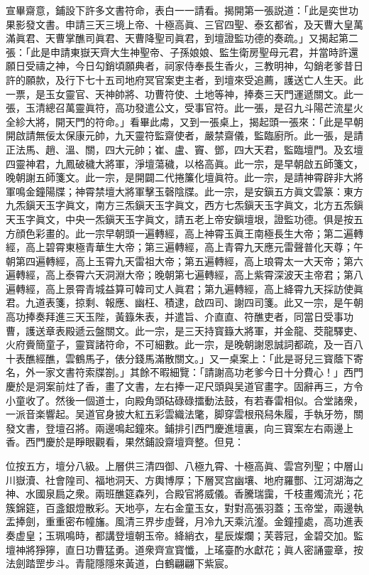 宣畢齋意，鋪設下許多文書符命，表白一一請看。揭開第一張説道：「此是奕世功果影發文書。申請三天三境上帝、十極高眞、三官四聖、泰玄都省，及天曹大皇萬滿眞君、天曹掌醮司眞君、天曹降聖司眞君，到壇證監功德的奏疏。」又揭起第二張：「此是申請東嶽天齊大生神聖帝、子孫娘娘、監生衛房聖母元君，并當時許還願日受禱之神，今日勾銷頃願典者，祠家侍奉長生香火，三教明神，勾銷老爹昔日許的願款，及行下七十五司地府冥官案吏主者，到壇來受追薦，護送亡人生天。此一票，是玉女靈官、天神帥將、功曹符使、土地等神，捧奏三天門運遞關文。此一張，玉清總召萬靈眞符，高功發遣公文，受事官符。此一張，是召九斗陽芒流星火全紾大將，開天門的符命。」看畢此䖏，又到一張桌上，揭起頭一張來：「此是早朝開啟請無佞太保康元帥，九天靈符監齋使者，嚴禁齋儀，監臨廚所。此一張，是請正法馬、趙、溫、關，四大元帥；崔、盧、竇、鄧，四大天君，監臨壇門。及玄壇四靈神君，九鳳破穢大將軍，淨壇蕩穢，以格高眞。此一宗，是早朝啟五師箋文，晚朝謝五師箋文。此一宗，是開闢二代捲簾化壇眞符。此一宗，是請神霄辟非大將軍鳴金鐘陽牒；神霄禁壇大將軍擊玉磬陰牒。此一宗，是安鎭五方眞文雲篆：東方九炁鎭天玉字眞文，南方三炁鎭天玉字眞文，西方七炁鎭天玉字眞文，北方五炁鎭天玉字眞文，中央一炁鎭天玉字眞文，請五老上帝安鎭壇垠，證監功德。俱是按五方顔色彩畫的。此一宗早朝頭一遍轉經，高上神霄玉眞王南極長生大帝；第二遍轉經，高上碧霄東極青華生大帝；第三遍轉經，高上青霄九天應元雷聲普化天尊；午朝第四遍轉經，高上玉霄九天雷祖大帝；第五遍轉經，高上琅霄太一大天帝；第六遍轉經，高上泰霄六天洞淵大帝；晚朝第七遍轉經，高上紫霄深波天主帝君；第八遍轉經，高上景霄青城益算可韓司丈人眞君；第九遍轉經，高上絳霄九天採訪使眞君。九道表箋，掠剩、報應、幽枉、積逮，啟四司、謝四司箋。此又一宗，是午朝高功捧奏拜進三天玉陛，黃籙朱表，并遣旨、介直直、符醮吏者，同當日受事功曹，護送章表殿遞云盤關文。此一宗，是三天持寳籙大將軍，并金龍、茭龍驛吏、火府賫簡童子，靈寳諸符命，不可細數。此一宗，是晚朝謝恩誠詞都疏，及一百八十表醮經醮，雲鶴馬子，俵分錢馬滿散關文。」又一桌案上：「此是哥兒三寳蔭下寄名，外一家文書符索牒劄。」其餘不暇細覽：「請謝高功老爹今日十分費心！」西門慶於是洞案前炷了香，畫了文書，左右捧一疋尺頭與吴道官畫字。固辭再三，方令小童收了。然後一個道士，向殿角頭𥑮碌碌擂動法鼓，有若春雷相似。合堂諸衆，一派音楽響起。吴道官身披大紅五彩雲織法氅，脚穿雲根飛舄朱履，手執牙笏，關發文書，登壇召將。兩邊鳴起鐘來。鋪排引西門慶進壇裏，向三寳案左右兩邊上香。西門慶於是睜眼觀看，果然鋪設齋壇齊整。但見：

\begin{myquote}
位按五方，壇分八級。上層供三清四御、八極九霄、十極高眞、雲宫列聖；中層山川嶽瀆、社會隍司、福地洞天、方輿博厚；下層冥宫幽壤、地府羅酆、江河湖海之神、水國泉扃之衆。兩班醮筵森列，合殿官將威儀。香騰瑞靄，千枝畫燭流光；花簇錦筵，百盞銀燈散彩。天地亭，左右金童玉女，對對高張羽蓋；玉帝堂，兩邊執盂捧劍，重重密布幢旛。風清三界步虛聲，月冷九天乘沆瀣。金鐘撞處，高功進表奏虚皇；玉珮鳴時，都講登壇朝玉帝。絳綃衣，星辰燦爛；芙蓉冠，金碧交加。監壇神將猙獰，直日功曹猛勇。道衆齊宣寳懺，上瑤臺酌水獻花；眞人密誦靈章，按法劍踏罡步斗。青龍隱隱來黃道，白鶴翩翩下紫宸。
\end{myquote}

